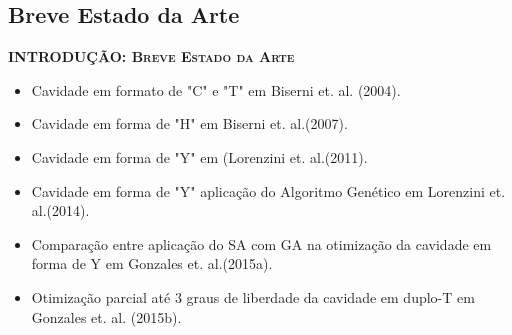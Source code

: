 \documentclass[xcolor=dvipsnames,10pt]{beamer}
\begin{document}
\subsection{Breve Estado da Arte}
	\begin{frame}{}
	\begin{block}{\textbf{\textsc{INTRODUÇÃO: Breve Estado da Arte}}}
		\begin{itemize}
		\item Cavidade em formato de "C" e "T"  em Biserni et. al. (2004). 
		\item Cavidade em forma de "H"  em Biserni et. al.(2007).
		\item Cavidade em forma de "Y"  em (Lorenzini et. al.(2011).
		\item Cavidade em forma de "Y" aplicação do Algoritmo Genético  em Lorenzini et. al.(2014).
		\item Comparação entre aplicação do SA com GA na otimização da cavidade em forma de Y  em Gonzales et. al.(2015a).
		\item Otimização parcial até 3 graus de liberdade da cavidade em duplo-T  em Gonzales et. al. (2015b).
	\end{itemize}
	\end{block}
\end{frame}
\end{document}
